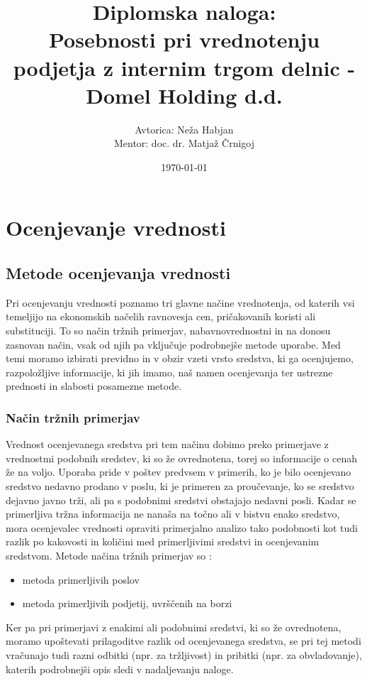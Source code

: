 \documentclass{article}
\begin{document}
\title{Diplomska naloga:\\
\textbf{Posebnosti pri vrednotenju podjetja z internim trgom delnic - Domel Holding d.d.} }

\author{Avtorica: Neža Habjan\\
Mentor: doc. dr. Matjaž Črnigoj}
\date{\today}

\maketitle
\newpage

\section{Ocenjevanje vrednosti}
\subsection{Metode ocenjevanja vrednosti}
Pri ocenjevanju vrednosti poznamo tri glavne načine vrednotenja, od katerih vsi temeljijo na ekonomskih načelih ravnovesja cen, pričakovanih koristi ali substituciji. To so način tržnih primerjav, nabavnovrednostni in na donosu zasnovan način, vsak od njih pa vključuje podrobnejše metode uporabe. Med temi moramo izbirati previdno in v obzir vzeti vrsto sredstva, ki ga ocenjujemo, razpoložljive informacije, ki jih imamo, naš namen ocenjevanja ter ustrezne prednosti in slabosti posamezne metode. 

\subsubsection{Način tržnih primerjav}
Vrednost ocenjevanega sredstva pri tem načinu dobimo preko primerjave z vrednostmi podobnih sredstev, ki so že ovrednotena, torej so informacije o cenah že na voljo. Uporaba pride v poštev predvsem v primerih, ko je bilo ocenjevano sredstvo nedavno prodano v poslu, ki je primeren za proučevanje, ko se sredstvo dejavno javno trži, ali pa s podobnimi sredstvi obstajajo nedavni posli. Kadar se primerljiva tržna informacija ne nanaša na točno ali v bistvu enako sredstvo, mora ocenjevalec vrednosti opraviti primerjalno analizo tako podobnosti kot tudi razlik po kakovosti in količini med primerljivimi sredstvi in ocenjevanim sredstvom. 
Metode načina tržnih primerjav so :
\begin{itemize}
\item metoda primerljivih poslov
\item metoda primerljivih podjetij, uvrščenih na borzi
\end{itemize}
Ker pa pri primerjavi z enakimi ali podobnimi sredstvi, ki so že ovrednotena, moramo upoštevati prilagoditve razlik od ocenjevanega sredstva, se pri tej metodi vračunajo tudi razni odbitki (npr. za tržljivost) in pribitki (npr. za obvladovanje), katerih podrobnejši opis sledi v nadaljevanju naloge.
\end{document}
